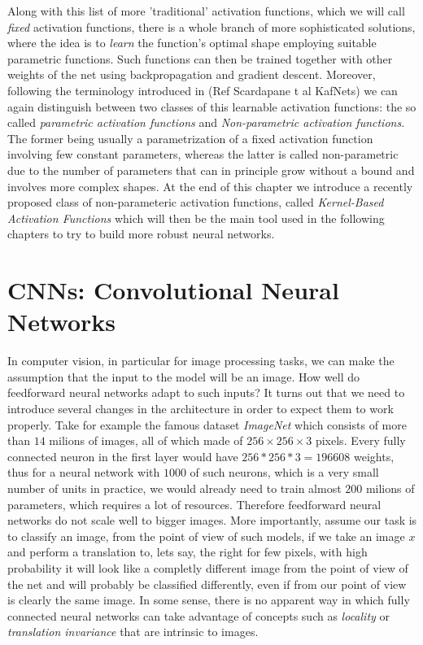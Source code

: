\documentclass[LaM,binding=0.6cm]{./packages/sapthesis/sapthesis}
\begin{document}
            Along with this list of more 'traditional' activation functions, which we will call \textit{fixed} activation functions, there is a whole branch of
            more sophisticated solutions, where the idea is to \textit{learn} the function's optimal shape employing suitable parametric functions. 
            Such functions can then be trained together with other weights of the net using backpropagation and gradient descent. Moreover, following the terminology
            introduced in (Ref Scardapane t al KafNets) we can again distinguish between two classes of this learnable activation functions: the so called
            \textit{parametric activation functions} and \textit{Non-parametric activation functions}. The former being usually a parametrization of a fixed 
            activation function involving few constant parameters, whereas the latter is called non-parametric due to the number of parameters that can in principle
            grow without a bound and involves more complex shapes. At the end of this chapter we introduce a recently proposed class of non-parameteric activation functions,
            called \textit{Kernel-Based Activation Functions} which will then be the main tool used in the following chapters to try to build more robust neural networks.    


        \section{CNNs: Convolutional Neural Networks}

            \label{cnns}
            In computer vision, in particular for image processing tasks, we can make the assumption that the input to the model will be an image. 
            How well do feedforward neural networks adapt to such inputs? It turns out that we need to introduce several changes in the architecture in order to expect 
            them to work properly. Take for example the famous dataset \textit{ImageNet} which consists of more than $ 14 $ milions of images,
            all of which made of $ 256 \times 256 \times 3 $ pixels. Every fully connected neuron in the first layer would have $ 256 * 256 * 3 =  196608 $ weights,
            thus for a neural network with $ 1000 $ of such neurons, which is a very small number of units in practice, we would already need to train almost $ 200 $ milions of parameters,
            which requires a lot of resources. Therefore feedforward neural networks do not scale well to bigger images. More importantly, assume our task is to 
            classify an image, from the point of view of such models, if we take an image $x$ and perform a translation to, lets say, the right for few pixels, with high 
            probability it will look like a completly different image from the point of view of the net and will probably be classified differently, even if 
            from our point of view is clearly the same image. In some sense, there is no apparent way in which fully connected neural networks can take advantage of 
            concepts such as \textit{locality} or \textit{translation invariance} that are intrinsic to images.
            
\end{document}
